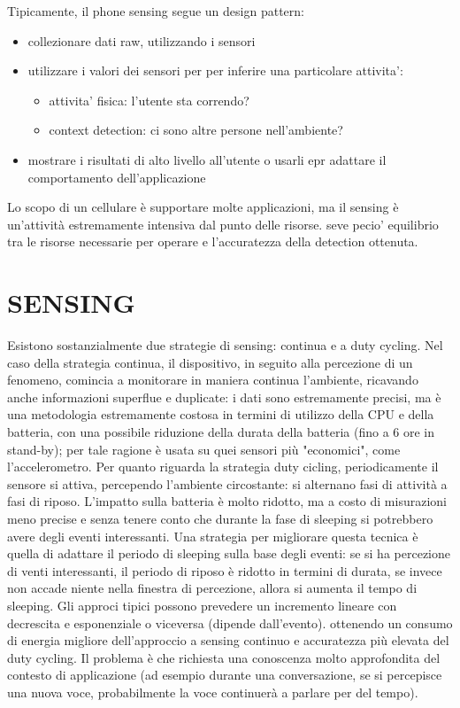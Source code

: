 \documentclass{article}
\begin{document}
Tipicamente, il phone sensing segue un design pattern:
\begin{itemize}
\item collezionare dati raw, utilizzando i sensori
\item utilizzare i valori dei sensori per per inferire una particolare attivita':
\begin{itemize}
\item attivita' fisica: l'utente sta correndo?
\item context detection: ci sono altre persone nell'ambiente?
\end{itemize}
\item mostrare i risultati di alto livello all'utente o usarli epr adattare il comportamento dell'applicazione
\end{itemize}

Lo scopo di un cellulare è supportare molte applicazioni, ma il sensing è un'attività estremamente intensiva dal punto delle risorse. seve pecio' equilibrio tra le risorse necessarie per operare e l'accuratezza della detection ottenuta.

\section{SENSING}
Esistono sostanzialmente due strategie di sensing: continua e a duty cycling.
Nel caso della strategia continua, il dispositivo, in seguito alla percezione di un fenomeno, comincia a monitorare in maniera continua l'ambiente, ricavando anche informazioni superflue e duplicate: i dati sono estremamente precisi, ma è una metodologia estremamente costosa in termini di utilizzo della CPU e della batteria, con una possibile riduzione della durata della batteria (fino a 6 ore in stand-by); per tale ragione è usata su quei sensori più "economici", come l'accelerometro.
Per quanto riguarda la strategia duty cicling, periodicamente il sensore si attiva, percependo l'ambiente circostante: si alternano fasi di attività a fasi di riposo. L'impatto sulla batteria è molto ridotto, ma a costo di misurazioni meno precise e senza tenere conto che durante la fase di sleeping si potrebbero avere degli eventi interessanti.
Una strategia per migliorare questa tecnica è quella di adattare il periodo di sleeping sulla base degli eventi: se si ha percezione di venti interessanti, il periodo di riposo è ridotto in termini di durata, se invece non accade niente nella finestra di percezione, allora si aumenta il tempo di sleeping.
Gli approci tipici possono prevedere un incremento lineare con decrescita e esponenziale o viceversa (dipende dall'evento). ottenendo un consumo di energia migliore dell'approccio a sensing continuo e accuratezza più elevata del duty cycling.
Il problema è che richiesta una conoscenza molto approfondita del contesto di applicazione (ad esempio durante una conversazione, se si percepisce una nuova voce, probabilmente la voce continuerà a parlare per del tempo).
\end{document}
